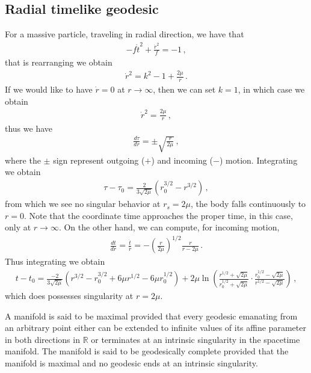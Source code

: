 \documentclass[11pt, onesided]{book}
\theoremstyle{break}
\theoremstyle{break}
\newcommand{\R}{\mathbb{R}}
\begin{document}
\subsection{Radial timelike geodesic}
For a massive particle, traveling in radial direction, we have that
\begin{align*}
-f\dot{t}^2 + \frac{\dot{r}^2}{f} = -1\,, 
\end{align*}
that is rearranging we obtain
\begin{align*}
\dot{r}^2 = k^2 - 1 + \frac{2\mu}{r}\,.
\end{align*}
If we would like to have $\dot{r} = 0$ at $r \to \infty$, then we can set $k = 1$, in which case we obtain
\begin{align*}
\dot{r}^2 = \frac{2\mu}{r}\,, 
\end{align*}
thus we have
\begin{align*}
\frac{d\tau}{dr} = \pm \sqrt{\frac{r}{2\mu}}\,,
\end{align*}
where the $\pm$ sign represent outgoing ($+$) and incoming ($-$) motion. Integrating we obtain
\begin{align*}
\tau - \tau_0 = \frac{2}{3\sqrt{2\mu}}\left( r_0^{3/2} -r^{3/2}\right)\,,
\end{align*}
from which we see no singular behavior at $r_s = 2\mu$, the body falls continuously to $r = 0$. Note that the coordinate time approaches the proper time, in this case, only at $r \to \infty$. On the other hand, we can compute, for incoming motion,
\begin{align*}
\frac{dt}{dr} = \frac{\dot{t}}{\dot{r}} = -\left( \frac{r}{2\mu} \right)^{1/2}\frac{r}{r-2\mu}\,.
\end{align*}
Thus integrating we obtain
\begin{align*}
t -t_0 = \frac{-2}{3\sqrt{2\mu}}\left( r^{3/2} - r_0^{3/2} + 6\mu r^{1/2} - 6\mu r_0^{1/2}\right) + 2\mu\ln\left( \frac{r^{1/2} + \sqrt{2\mu}}{r_0^{1/2}+\sqrt{2\mu}} \cdot \frac{r_0^{1/2} - \sqrt{2\mu}}{r^{1/2}-\sqrt{2\mu}} \right)\,,
\end{align*}
which does possesses singularity at $r = 2\mu$.  
\newpage



A manifold is said to be maximal provided that every geodesic emanating from an arbitrary point either can be extended to infinite values of its affine parameter in both directions in $\R$ or terminates at an intrinsic singularity in the spacetime manifold.  The manifold is said to be geodesically complete provided that the manifold is maximal and no geodesic ends at an intrinsic singularity.\\
\end{document}

